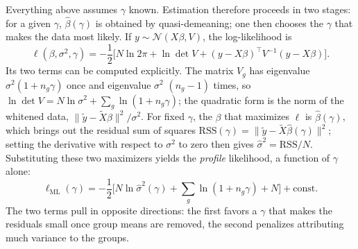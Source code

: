 \documentclass[11pt,a4paper]{article}
\begin{document}
Everything above assumes $\gamma$ known. Estimation therefore proceeds in two stages: for a given $\gamma$,
$\hat\beta(\gamma)$ is obtained by quasi-demeaning; one then chooses the $\gamma$ that makes the data most likely. If
$y \sim \mathcal N(X\beta, V)$, the log-likelihood is
\[
\ell(\beta, \sigma^2, \gamma) = -\frac12\Big[N\ln 2\pi + \ln\det V + (y - X\beta)^\top V^{-1}(y - X\beta)\Big].
\]
Its two terms can be computed explicitly. The matrix $V_g$ has eigenvalue $\sigma^2(1 + n_g\gamma)$ once and eigenvalue
$\sigma^2$ $(n_g - 1)$ times, so $\ln\det V = N\ln\sigma^2 + \sum_g \ln(1 + n_g\gamma)$; the quadratic form is the norm
of the whitened data, $\lVert \tilde y - \tilde X\beta \rVert^2/\sigma^2$. For fixed $\gamma$, the $\beta$ that
maximizes $\ell$ is $\hat\beta(\gamma)$, which brings out the residual sum of squares
$\mathrm{RSS}(\gamma) = \lVert\tilde y - \tilde X\hat\beta(\gamma)\rVert^2$; setting the derivative with respect to
$\sigma^2$ to zero then gives $\hat\sigma^2 = \mathrm{RSS}/N$. Substituting these two maximizers yields the
\emph{profile} likelihood, a function of $\gamma$ alone:
\[
\ell_{\text{ML}}(\gamma) = -\frac12\Big[N\ln\hat\sigma^2(\gamma) + \sum_g\ln(1 + n_g\gamma) + N\Big] + \text{const}.
\]
The two terms pull in opposite directions: the first favors a $\gamma$ that makes the residuals small once group means
are removed, the second penalizes attributing much variance to the groups.
\end{document}
